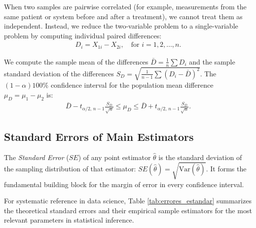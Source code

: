 \begin{definicion}
	When two samples are pairwise correlated (for example, measurements from the same patient or system before and after a treatment), we cannot treat them as independent. Instead, we reduce the two-variable problem to a single-variable problem by computing individual paired differences:
	\begin{align}
		D_i = X_{1i} - X_{2i}, \quad \text{for } i = 1, 2, \ldots, n.
	\end{align}
	
	We compute the sample mean of the differences $\bar{D} = \frac{1}{n}\sum D_i$ and the sample standard deviation of the differences $S_D = \sqrt{\frac{1}{n-1}\sum (D_i - \bar{D})^2}$. The $(1-\alpha)100\%$ confidence interval for the population mean difference $\mu_D = \mu_1 - \mu_2$ is:
	\begin{align}
		\bar{D} - t_{\alpha/2, \, n-1} \frac{S_D}{\sqrt{n}} \leq \mu_D \leq \bar{D} + t_{\alpha/2, \, n-1} \frac{S_D}{\sqrt{n}}.
	\end{align}
\end{definicion}

\subsection{Standard Errors of Main Estimators}

The \emph{Standard Error} ($SE$) of any point estimator $\hat{\theta}$ is the standard deviation of the sampling distribution of that estimator: $SE(\hat{\theta}) = \sqrt{\text{Var}(\hat{\theta})}$. It forms the fundamental building block for the margin of error in every confidence interval.

For systematic reference in data science, Table \ref{tab:errores_estandar} summarizes the theoretical standard errors and their empirical sample estimators for the most relevant parameters in statistical inference.

